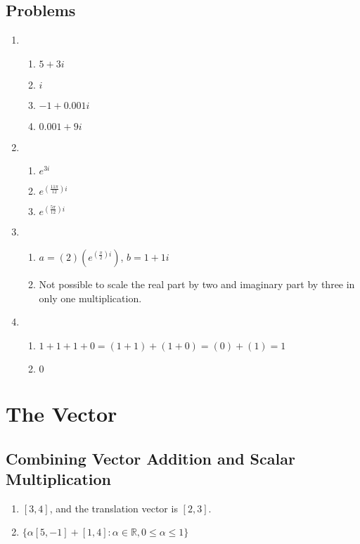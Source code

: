 \documentclass{article}
\begin{document}
    \subsection{Problems}
    \begin{enumerate}
        \item 
            \begin{enumerate}
                \item $5 + 3i$
                \item $i$
                \item $-1 + 0.001i$
                \item $0.001 + 9i$
            \end{enumerate}
        \item
            \begin{enumerate}
                \item $e^{3i}$
                \item $e^{(\frac{11\pi}{12})i}$
                \item $e^{(\frac{5\pi}{12})i}$
            \end{enumerate}
        \item
            \begin{enumerate}
                \item $a = (2)(e^{(\frac{\pi}{2})i})$, $b = 1 + 1i$
                \item Not possible to scale the real part by two and imaginary
                    part by three in only one multiplication.
            \end{enumerate}
        \item
            \begin{enumerate}
                \item $1 + 1 + 1 + 0 = (1 + 1) + (1 + 0) = (0) + (1) = 1$
                \item $0$
            \end{enumerate}
    \end{enumerate}
    \section{The Vector}
    \addtocounter{subsection}{5}
    \subsection{Combining Vector Addition and Scalar Multiplication}
    \begin{enumerate}
        \item $[3,4]$, and the translation vector is $[2,3]$. 
        \item $\{\alpha [5,-1] + [1,4] : \alpha \in \mathbb{R}, 0 \leq \alpha \leq 1\}$
    \end{enumerate}
\end{document}

